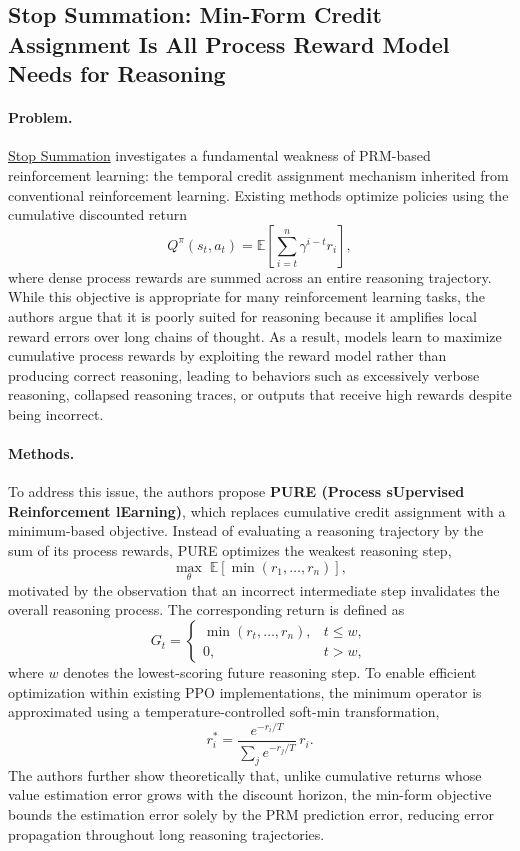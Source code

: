 \documentclass[11pt]{article}
\begin{document}
\subsection{Stop Summation: Min-Form Credit Assignment Is All Process Reward Model Needs for Reasoning}


\paragraph{Problem. }
\href{https://arxiv.org/abs/2504.15275}{Stop Summation} investigates a fundamental weakness of PRM-based reinforcement learning: the temporal credit assignment mechanism inherited from conventional reinforcement learning. Existing methods optimize policies using the cumulative discounted return
\[
Q^{\pi}(s_t,a_t)
=
\mathbb{E}
\left[
\sum_{i=t}^{n}
\gamma^{i-t}r_i
\right],
\]
where dense process rewards are summed across an entire reasoning trajectory. While this objective is appropriate for many reinforcement learning tasks, the authors argue that it is poorly suited for reasoning because it amplifies local reward errors over long chains of thought. As a result, models learn to maximize cumulative process rewards by exploiting the reward model rather than producing correct reasoning, leading to behaviors such as excessively verbose reasoning, collapsed reasoning traces, or outputs that receive high rewards despite being incorrect. 

\paragraph{Methods. }To address this issue, the authors propose \textbf{PURE (Process sUpervised Reinforcement lEarning)}, which replaces cumulative credit assignment with a minimum-based objective. Instead of evaluating a reasoning trajectory by the sum of its process rewards, PURE optimizes the weakest reasoning step,
\[
\max_\theta
\;
\mathbb{E}
\left[
\min(r_1,\ldots,r_n)
\right],
\]
motivated by the observation that an incorrect intermediate step invalidates the overall reasoning process. The corresponding return is defined as
\[
G_t=
\begin{cases}
\min(r_t,\ldots,r_n), & t\le w,\\
0, & t>w,
\end{cases}
\]
where \(w\) denotes the lowest-scoring future reasoning step. To enable efficient optimization within existing PPO implementations, the minimum operator is approximated using a temperature-controlled soft-min transformation,
\[
r_i^{*}
=
\frac{e^{-r_i/T}}
{\sum_j e^{-r_j/T}}
\,r_i.
\]
The authors further show theoretically that, unlike cumulative returns whose value estimation error grows with the discount horizon, the min-form objective bounds the estimation error solely by the PRM prediction error, reducing error propagation throughout long reasoning trajectories. 
\end{document}
